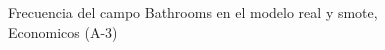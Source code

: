 \begin{figure}[H]
    \centering
    
    \caption{Frecuencia del campo Bathrooms en el modelo real y smote, Economicos (A-3)}
    \label{frecuency-Bathrooms-smote-enc}
\end{figure}